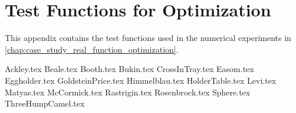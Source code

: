 \chapter{Test Functions for Optimization}
\label{app:test_functions}
  This appendix contains the test functions used in the numerical experiments in 
  \vref{chap:case_study_real_function_optimization}.

  {Ackley.tex}
  {Beale.tex}
  {Booth.tex}
  {Bukin.tex}
  {CrossInTray.tex}
  {Easom.tex}
  {Eggholder.tex}
  {GoldsteinPrice.tex}
  {Himmelblau.tex}
  {HolderTable.tex}
  {Levi.tex}
  {Matyas.tex}
  {McCormick.tex}
  {Rastrigin.tex}
  {Rosenbrock.tex}
  {Sphere.tex}
  {ThreeHumpCamel.tex}
